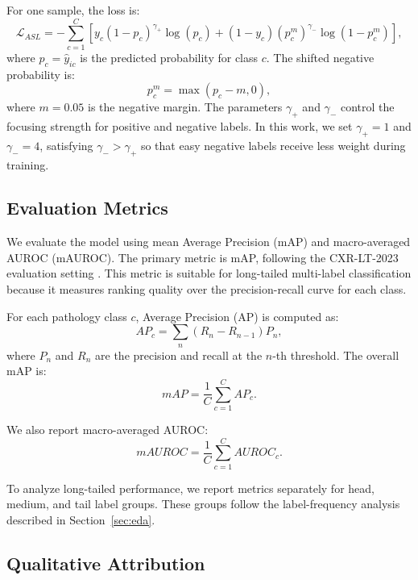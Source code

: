 For one sample, the loss is:
\begin{equation}
\mathcal{L}_{ASL}
=
-\sum_{c=1}^{C}
\left[
y_c (1-p_c)^{\gamma_+}\log(p_c)
+
(1-y_c)(p_c^m)^{\gamma_-}\log(1-p_c^m)
\right],
\end{equation}
where $p_c=\hat{y}_{ic}$ is the predicted probability for class $c$. The shifted negative probability is:
\begin{equation}
p_c^m = \max(p_c - m, 0),
\end{equation}
where $m = 0.05$ is the negative margin. The parameters $\gamma_+$ and $\gamma_-$ control the focusing strength for positive and negative labels. In this work, we set $\gamma_+ = 1$ and $\gamma_- = 4$, satisfying $\gamma_- > \gamma_+$ so that easy negative labels receive less weight during training.

\subsection{Evaluation Metrics}
\label{subsec:method_evaluation_metrics}

We evaluate the model using mean Average Precision (mAP) and macro-averaged AUROC (mAUROC). The primary metric is mAP, following the CXR-LT-2023 evaluation setting \cite{holste2024cxrlt}. This metric is suitable for long-tailed multi-label classification because it measures ranking quality over the precision-recall curve for each class.

For each pathology class $c$, Average Precision (AP) is computed as:
\begin{equation}
AP_c = \sum_n (R_n - R_{n-1})P_n,
\end{equation}
where $P_n$ and $R_n$ are the precision and recall at the $n$-th threshold. The overall mAP is:
\begin{equation}
mAP = \frac{1}{C}\sum_{c=1}^{C} AP_c.
\end{equation}

We also report macro-averaged AUROC:
\begin{equation}
mAUROC = \frac{1}{C}\sum_{c=1}^{C} AUROC_c.
\end{equation}

To analyze long-tailed performance, we report metrics separately for head, medium, and tail label groups. These groups follow the label-frequency analysis described in Section~\ref{sec:eda}.

\subsection{Qualitative Attribution}
\label{subsec:method_qualitative_attribution}

